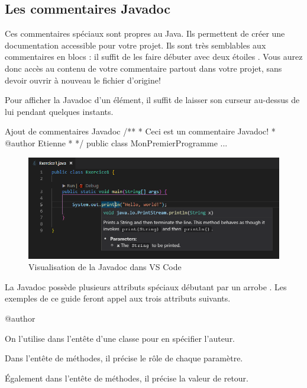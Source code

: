 \documentclass[12pt]{report}
\newcommand{\commande}[1]{%
\tcbox[on line, size=fbox, colframe=black, boxrule=0.75pt, tcbox raise base]{#1} %
}
\begin{document}
%
\subsection{Les commentaires Javadoc}
%
%
Ces commentaires spéciaux sont propres au Java. Ils permettent de créer une documentation accessible pour votre projet. Ils sont très semblables aux commentaires en blocs : il suffit de les faire débuter avec deux étoiles \commande{/**}. Vous aurez donc accès au contenu de votre commentaire partout dans votre projet, sans devoir ouvrir à nouveau le fichier d'origine! 

Pour afficher la Javadoc d'un élément, il suffit de laisser son curseur au-dessus de lui pendant quelques instants.
%
%
\begin{MyTCB}{Ajout de commentaires Javadoc}
/**
 * Ceci est un commentaire Javadoc!
 * @author Etienne
 *
 */
public class MonPremierProgramme { ... }
\end{MyTCB}
%
%
\begin{figure}[!ht]
	\centering
	\includegraphics[width=0.99\linewidth]{vs-code-javadoc.png}
	\caption{Visualisation de la Javadoc dans VS Code}
\end{figure}
%
%
La Javadoc possède plusieurs attributs spéciaux débutant par un arrobe \commande{@}. Les exemples de ce guide feront appel aux trois attributs suivants.

\begin{labeling}{@author\ }

\item[\textbf{@author}] On l'utilise dans l'entête d'une classe pour en spécifier l'auteur.
\item[\textbf{@param}] Dans l'entête de méthodes, il précise le rôle de chaque paramètre.
\item[\textbf{@return}] Également dans l'entête de méthodes, il précise la valeur de retour.

\end{labeling}
%
\end{document}
